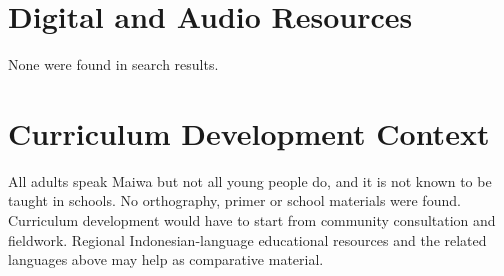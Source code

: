 \documentclass[12pt]{article}
\begin{document}
\section{Digital and Audio Resources}
None were found in search results.

\section{Curriculum Development Context}
All adults speak Maiwa but not all young people do, and it is not known to be taught in schools. No orthography, primer or school materials were found. Curriculum development would have to start from community consultation and fieldwork. Regional Indonesian-language educational resources and the related languages above may help as comparative material.
\end{document}
